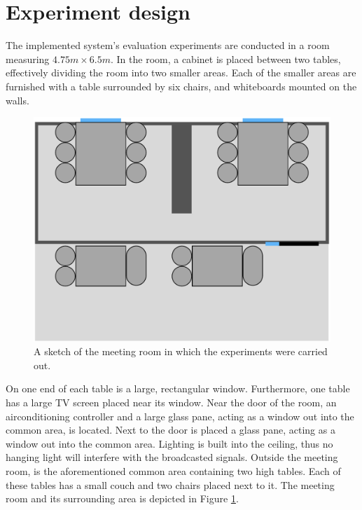 \section{Experiment design}\label{sec:experiment_design}
The implemented system's evaluation experiments are conducted in a room measuring $4.75m \times 6.5m$.
In the room, a cabinet is placed between two tables, effectively dividing the room into two smaller areas. 
Each of the smaller areas are furnished with a table surrounded by six chairs, and whiteboards mounted on the walls.
\begin{figure}[h]
    \centering
    \includegraphics[scale=0.5]{images/experiment_room.png}
    \caption{A sketch of the meeting room in which the experiments were carried out.}
    \label{fig:experiment_room}
\end{figure}
On one end of each table is a large, rectangular window.
Furthermore, one table has a large TV screen placed near its window. 
Near the door of the room, an airconditioning controller and a large glass pane, acting as a window out into the common area, is located. 
Next to the door is placed a glass pane, acting as a window out into the common area. 
Lighting is built into the ceiling, thus no hanging light will interfere with the broadcasted signals. 
Outside the meeting room, is the aforementioned common area containing two high tables.
Each of these tables has a small couch and two chairs placed next to it.
The meeting room and its surrounding area is depicted in Figure \ref{fig:experiment_room}.

